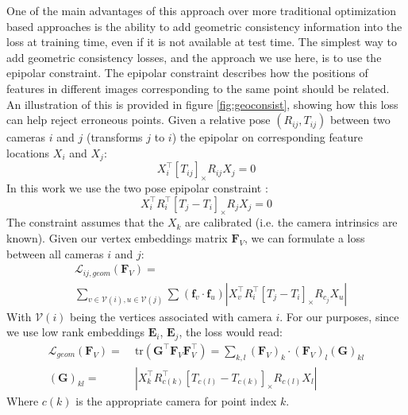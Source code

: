 \documentclass[10pt,twocolumn,letterpaper]{article}
\newcommand{\mat}[1]{\mathbf{#1}}
\newcommand{\cross}[1]{[#1]_{\times}}
\begin{document}
One of the main advantages of this approach over more traditional optimization based approaches is the ability to add geometric consistency information into the loss at training time, even if it is not available at test time.
The simplest way to add geometric consistency losses, and the approach we use here, is to use the epipolar constraint.
The epipolar constraint describes how the positions of features in different images corresponding to the same point should be related.
An illustration of this is provided in figure \ref{fig:geoconsist}, showing how this loss can help reject erroneous points.
Given a relative pose $(R_{ij}, T_{ij})$ between two cameras $i$ and $j$  (transforms $j$ to $i$) the epipolar on corresponding feature locations $X_i$ and $X_j$:
\begin{equation}
X_{i}^\top \cross{T_{ij}}R_{ij} X_{j} = 0
\label{eq:essential_constraint_rel}
\end{equation}
In this work we use the two pose epipolar constraint \cite{tron2014quotient}:
\begin{equation}
X_{i}^\top R_{i}^\top \cross{T_{j} - T_{i}}R_{j} X_{j} = 0
\label{eq:essential_constraint}
\end{equation}
The constraint assumes that the $X_k$ are calibrated (i.e. the camera intrinsics are known). 
Given our vertex embeddings matrix $\mat{F}_V$, we can formulate a loss between all cameras $i$ and $j$:
\begin{align}
&\mathcal{L}_{ij,geom}(\mat{F}_V) = \nonumber \\ 
&\sum_{v \in \mathcal{V}(i),u \in \mathcal{V}(j)} \sum_{} (\mat{f}_v \cdot \mat{f}_u) \left|X_{v}^\top R_{i}^\top \cross{T_{j} - T_{i}}R_{c_j} X_{u}\right|
\label{eq:geom_cost}
\end{align}
With $\mathcal{V}(i)$ being the vertices associated with camera $i$.
For our purposes, since we use low rank embeddings $\mat{E}_{i}$, $\mat{E}_{j}$, the loss would read:
\begin{align} 
\mathcal{L}_{geom}(\mat{F}_V)
=&\; \mathrm{tr}(\mat{G}^\top \mat{F}_V\mat{F}_V^\top) = \sum_{k,l} (\mat{F}_V)_{k} \cdot (\mat{F}_V)_{l} (\mat{G})_{kl} \label{eq:geom_cost2} \\
(\mat{G})_{kl} =&\; \left|X_{k}^\top R_{c(k)}^\top \cross{T_{c(l)} - T_{c(k)}}R_{c(l)} X_{l}\right| \nonumber
\end{align}
Where $c(k)$ is the appropriate camera for point index $k$.
\end{document}
